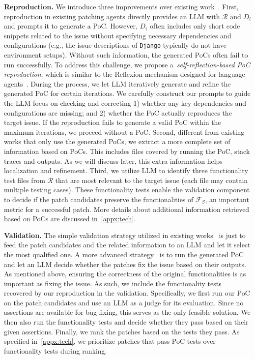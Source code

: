 \noindent\textbf{Reproduction.}
We introduce three improvements over existing work~\cite{xia2024agentless}.
First, reproduction in existing patching agents directly provides an LLM with $\mathcal{R}$ and $D_i$ and prompts it to generate a PoC.
However, $D_i$ often includes only short code snippets related to the issue without specifying necessary dependencies and configurations (e.g., the issue descriptions of \texttt{Django} typically do not have environment setups). 
Without such information, the generated PoCs often fail to run successfully. 
To address this challenge, we propose a~\emph{self-reflection-based PoC reproduction}, which is similar to the Reflexion mechanism designed for language agents~\cite{shinn2024reflexion}.
During the process, we let LLM iteratively generate and refine the generated PoC for certain iterations. 
We carefully construct our prompts to guide the LLM focus on checking and correcting 1) whether any key dependencies and configurations are missing; and 2) whether the PoC actually reproduces the target issue. 
If the reproduction fails to generate a valid PoC within the maximum iterations, we proceed without a PoC.
Second, different from existing works that only use the generated PoCs, we extract a more complete set of information based on PoCs.
This includes files covered by running the PoC, stack traces and outputs. 
As we will discuss later, this extra information helps localization and refinement. 
Third, we utilize LLM to identify three functionality test files from $\mathcal{R}$ that are most relevant to the target issue (each file may contain multiple testing cases).
These functionality tests enable the validation component to decide if the patch candidates preserve the functionalities of $\mathcal{F}_{S}$, an important metric for a successful patch.
More details about additional information retrieved based on PoCs are discussed in~\cref{appx:tech}.

\noindent\textbf{Validation.}
The simple validation strategy utilized in existing works~\cite{tao2024magis, Globant_Code_Fixer_Agent, ma2024lingma} is just to feed the patch candidates and the related information to an LLM and let it select the most qualified one. 
A more advanced strategy~\cite{liu2024marscode,wang2024openhands,arora2024masai} is to run the generated PoC and let an LLM decide whether the patches fix the issue based on their outputs.
As mentioned above, ensuring the correctness of the original functionalities is as important as fixing the issue.  
As such, we include the functionality tests recovered by our reproduction in the validation. 
Specifically, we first run our PoC on the patch candidates and use an LLM as a judge for its evaluation. 
Since no assertions are available for bug fixing, this serves as the only feasible solution.
We then also run the functionality tests and decide whether they pass based on their given assertions.
Finally, we rank the patches based on the tests they pass.
As specified in~\cref{appx:tech}, we prioritize patches that pass PoC tests over functionality tests during ranking.

